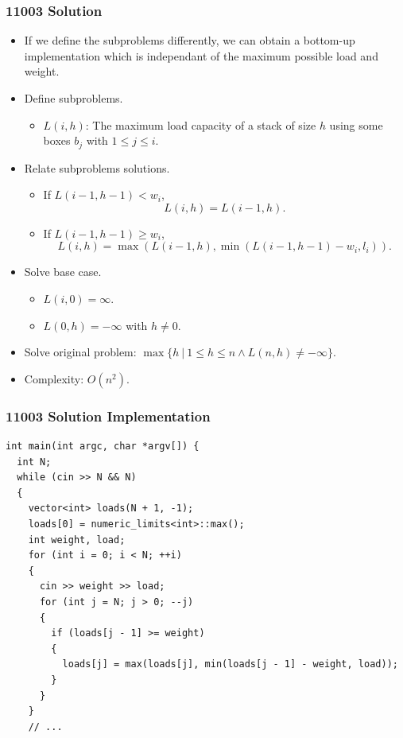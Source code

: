\documentclass{beamer}
\begin{document}
\begin{frame}%
\frametitle{11003 Solution}

\scriptsize

\begin{itemize}

\item If we define the subproblems differently, we can obtain a bottom-up implementation which is independant
of the maximum possible load and weight.

\item<2-> Define subproblems.
\begin{itemize}
\scriptsize
\item <2-> $L(i, h)$: The maximum load capacity of a stack of size $h$ using some boxes $b_j$ with $1 \le j \le i$.
\end{itemize}

\item<3-> Relate subproblems solutions.
\begin{itemize}
\scriptsize
\item <3-> If $L(i - 1, h - 1) < w_i$,
$$
L(i, h) = L(i - 1, h).
$$
\item <4-> If $L(i - 1, h - 1) \ge w_i$,
$$
L(i, h) = \max(L(i - 1, h), \min(L(i - 1, h - 1) - w_i, l_i)).
$$
\end{itemize}

\item<5-> Solve base case.
\begin{itemize}
\scriptsize
\item <5-> $L(i, 0) = \infty$.
\item <5-> $L(0, h) = -\infty$ with $h \ne 0$.
\end{itemize}

\vspace{0.1cm}

\item<6-> Solve original problem: $\max \{ h\ |\ 1 \le h \le n \wedge L(n, h) \ne -\infty\}$.

\vspace{0.1cm}

\item<7-> Complexity: $O(n^2)$.

\end{itemize}

\end{frame}


\begin{frame}[containsverbatim]
\frametitle{11003 Solution Implementation}
\scriptsize

\begin{lstlisting}
int main(int argc, char *argv[]) {
  int N;
  while (cin >> N && N)
  {
    vector<int> loads(N + 1, -1);
    loads[0] = numeric_limits<int>::max();
    int weight, load;
    for (int i = 0; i < N; ++i)
    {
      cin >> weight >> load;
      for (int j = N; j > 0; --j)
      {
        if (loads[j - 1] >= weight)
        {
          loads[j] = max(loads[j], min(loads[j - 1] - weight, load));
        }
      }
    }
    // ...
\end{lstlisting}

\end{frame}
\end{document}
